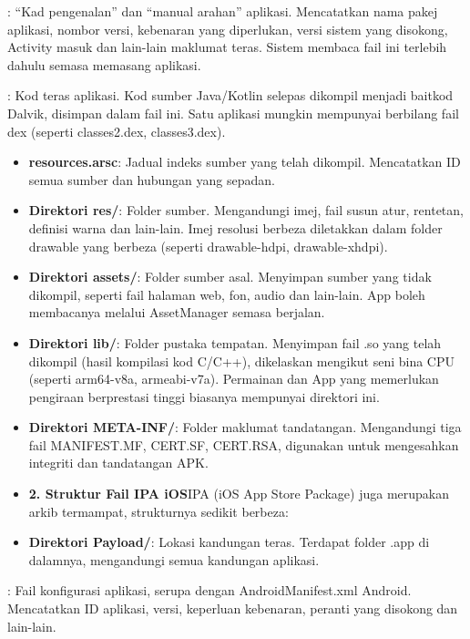 
: “Kad pengenalan” dan “manual arahan” aplikasi. Mencatatkan nama pakej aplikasi, nombor versi, kebenaran yang diperlukan, versi sistem yang disokong, Activity masuk dan lain-lain maklumat teras. Sistem membaca fail ini terlebih dahulu semasa memasang aplikasi.


: Kod teras aplikasi. Kod sumber Java/Kotlin selepas dikompil menjadi baitkod Dalvik, disimpan dalam fail ini. Satu aplikasi mungkin mempunyai berbilang fail dex (seperti classes2.dex, classes3.dex).

\begin{itemize}
  \item \textbf{resources.arsc}: Jadual indeks sumber yang telah dikompil. Mencatatkan ID semua sumber dan hubungan yang sepadan.
  \item \textbf{Direktori res/}: Folder sumber. Mengandungi imej, fail susun atur, rentetan, definisi warna dan lain-lain. Imej resolusi berbeza diletakkan dalam folder drawable yang berbeza (seperti drawable-hdpi, drawable-xhdpi).
  \item \textbf{Direktori assets/}: Folder sumber asal. Menyimpan sumber yang tidak dikompil, seperti fail halaman web, fon, audio dan lain-lain. App boleh membacanya melalui AssetManager semasa berjalan.
  \item \textbf{Direktori lib/}: Folder pustaka tempatan. Menyimpan fail .so yang telah dikompil (hasil kompilasi kod C/C++), dikelaskan mengikut seni bina CPU (seperti arm64-v8a, armeabi-v7a). Permainan dan App yang memerlukan pengiraan berprestasi tinggi biasanya mempunyai direktori ini.
  \item \textbf{Direktori META-INF/}: Folder maklumat tandatangan. Mengandungi tiga fail MANIFEST.MF, CERT.SF, CERT.RSA, digunakan untuk mengesahkan integriti dan tandatangan APK.
  \item \textbf{2. Struktur Fail IPA iOS}IPA (iOS App Store Package) juga merupakan arkib termampat, strukturnya sedikit berbeza:
  \item \textbf{Direktori Payload/}: Lokasi kandungan teras. Terdapat folder .app di dalamnya, mengandungi semua kandungan aplikasi.
\end{itemize}


: Fail konfigurasi aplikasi, serupa dengan AndroidManifest.xml Android. Mencatatkan ID aplikasi, versi, keperluan kebenaran, peranti yang disokong dan lain-lain.

